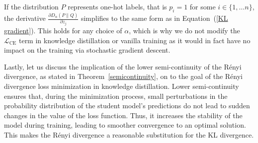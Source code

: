 \begin{rem}
If the distribution $P$ represents one-hot labels, that is $p_i=1$ for some $i\in\lbrace 1,\dots n\rbrace$, the derivative $\frac{\partial D_\alpha(P \| Q)}{\partial z_j}$ simplifies to the same form as in Equation~(\ref{KL gradient}). This holds for any choice of $\alpha$, which is why we do not modify the $\mathcal{L}_{\text{CE}}$ term in knowledge distillation or vanilla training as it would in fact have no impact on the training via stochastic gradient descent.
\end{rem}

\begin{rem}
    Lastly, let us discuss the implication of the lower semi-continuity of the Rényi divergence, as stated in Theorem~\ref{semicontinuity}, on to the goal of the Rényi divergence loss minimization in knowledge distillation. Lower semi-continuity ensures that, during the minimization process, small perturbations in the probability distribution of the student model's predictions do not lead to sudden changes in the value of the loss function. Thus, it increases the stability of the model during training, leading to smoother convergence to an optimal solution. This makes the Rényi divergence a reasonable substitution for the KL divergence.
\end{rem}

